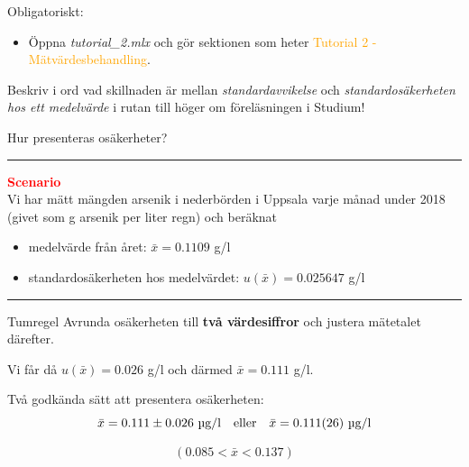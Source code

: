 \documentclass[9pt]{beamer}
\newcommand*\mean[1]{\bar{#1}}
\begin{document}
    \begin{frame}[t]
    Obligatoriskt:
    \begin{itemize}
        \item Öppna \textit{tutorial\_2.mlx} och gör sektionen som heter \textcolor{orange}{Tutorial 2 - Mätvärdesbehandling}.
    \end{itemize}
    \vspace{1cm}
    Beskriv i ord vad skillnaden är mellan \textit{standardavvikelse} och \textit{standardosäkerheten hos ett medelvärde} i rutan till höger om föreläsningen i Studium!
    \end{frame}
    
    \begin{frame}{Hur presenteras osäkerheter?}
        \hrule\vspace{0.6em}
        \textcolor{red}{\textbf{Scenario}}\\ 
        Vi har mätt mängden arsenik i nederbörden i Uppsala varje månad under 2018 (givet som \textmu g arsenik per liter regn) och beräknat
        \begin{itemize}
            \item medelvärde från året: $\bar{x} = 0.1109$ \textmu g/l
            \item standardosäkerheten hos medelvärdet: $u\left(\bar{x}\right) = 0.025647$ \textmu g/l
        \end{itemize}
        \vspace{0.6em}\hrule
        \pause
        \begin{block}{Tumregel}
            Avrunda osäkerheten till \textbf{två värdesiffror} och justera mätetalet därefter.
        \end{block}
        \vspace{0.2cm}
        Vi får då $u(\bar{x}) = 0.026$ \textmu g/l och därmed $\bar{x} = 0.111$ \textmu g/l.
        \vspace{0.5cm}
        
        \pause
        Två godkända sätt att presentera osäkerheten:
        \begin{equation*}
            \mean{x} = \num[separate-uncertainty=true]{0.111 \pm 0.026} \text{ \textmu g/l} 
            \quad
            \text{eller}
            \quad
            \mean{x} = \num{0.111 \pm 0.026} \text{ \textmu g/l}   
        \end{equation*}
        
        
        
        \begin{equation*}
            \left(0.085 < \bar{x} < 0.137\right)
        \end{equation*}
            
    \end{frame}
    
\end{document}
